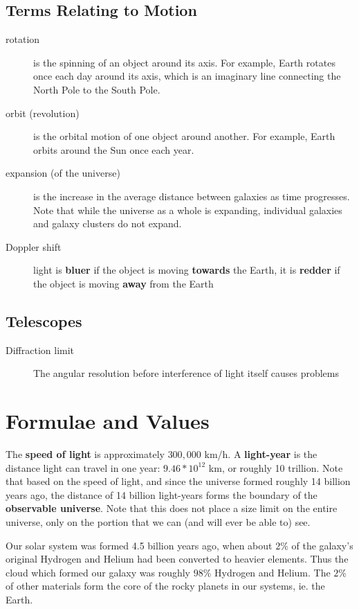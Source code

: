 \documentclass[12pt]{article}
\begin{document}
\subsection{Terms Relating to Motion}
\begin{description}
\item[rotation] is the spinning of an object around its axis. For example, Earth rotates once each day around its axis, which is an imaginary
line connecting the North Pole to the South Pole.
\item[orbit (revolution)] is the orbital motion of one object around another. For example, Earth orbits around the Sun once each year.
\item[expansion (of the universe)] is the increase in the average distance between galaxies as time progresses. Note that while the universe as a whole is expanding, individual galaxies and galaxy clusters do not expand.
    \item[Doppler shift] light is \textbf{bluer} if the object is moving \textbf{towards} the Earth, it is \textbf{redder} if the object is moving \textbf{away} from the Earth
\end{description}

\subsection{Telescopes}

\begin{description}
    \item[Diffraction limit] The angular resolution before interference of light itself causes problems
\end{description}

\section{Formulae and Values}
The {\bf speed of light} is approximately $300,000$ km/h. A {\bf light-year} is the distance light can travel in one year: $9.46 * 10^{12}$ km, or roughly 10 trillion. Note that based on the speed of light, and since the universe formed roughly 14 billion years ago, the distance of 14 billion light-years forms the boundary of the {\bf observable universe}. Note that this does not place a size limit on the entire universe, only on the portion that we can (and will ever be able to) see.

Our solar system was formed 4.5 billion years ago, when about $2\%$ of the galaxy's original Hydrogen and Helium had been converted to heavier elements. Thus the cloud which formed our galaxy was roughly $98\%$ Hydrogen and Helium. The $2\%$ of other materials form the core of the rocky planets in our systems, ie. the Earth.
\end{document}
